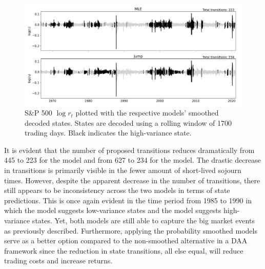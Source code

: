 \begin{figure}[H] 
    \centering
    \includegraphics[width=1.0\textwidth]{analysis/stylized_facts/images/decoded_states_filter.png}
    \caption[S\&P 500 $\log r_t$ plotted with the respective models' smoothed decoded states]{S\&P 500 $\log r_t$ plotted with the respective models' smoothed decoded states. States are decoded using a rolling window of 1700 trading days.  Black indicates the high-variance state.}
    \label{fig:stylized_facts_decoded_states_filtered} 
\end{figure}

It is evident that the number of proposed transitions reduces dramatically from 445 to 223 for the \mle model and from 627 to 234 for the \jump model. The drastic decrease in transitions is primarily visible in the fewer amount of short-lived sojourn times. However, despite the apparent decrease in the number of transitions, there still appears to be inconsistency across the two models in terms of state predictions. This is once again evident in the time period from 1985 to 1990 in which the \mle model suggests low-variance states and the \jump model suggests high-variance states. Yet, both models are still able to capture the big market events as previously described. Furthermore, applying the probability smoothed models serve as a better option compared to the non-smoothed alternative in a DAA framework since the reduction in state transitions, all else equal, will reduce trading costs and increase returns. 

